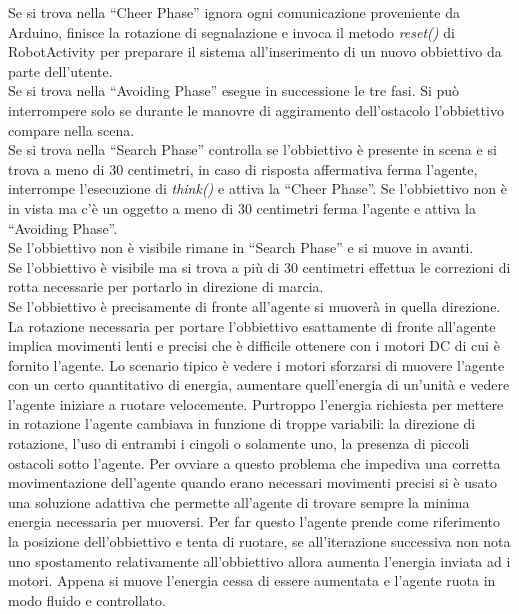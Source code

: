Se si trova nella ``Cheer Phase'' ignora ogni comunicazione proveniente da 
Arduino, finisce la rotazione di segnalazione e invoca il metodo \emph{reset()} di 
RobotActivity per preparare il sistema all'inserimento di un nuovo obbiettivo da 
parte dell'utente.\\
Se si trova nella ``Avoiding Phase'' esegue in successione le tre fasi. 
Si può interrompere solo se durante le manovre di aggiramento dell'ostacolo
l'obbiettivo compare nella scena.\\
Se si trova nella ``Search Phase'' controlla se l'obbiettivo è presente in scena e 
si trova a meno di 30 centimetri, in caso di risposta affermativa ferma l'agente,
interrompe l'esecuzione di \emph{think()} e attiva la ``Cheer Phase''. 
Se l'obbiettivo non è in vista ma c'è un oggetto a meno di 30 centimetri ferma l'agente
e attiva la ``Avoiding Phase''.\\
Se l'obbiettivo non è visibile rimane in ``Search Phase'' e si muove in avanti.\\
Se l'obbiettivo è visibile ma si trova a più di 30 centimetri effettua le correzioni di rotta
necessarie per portarlo in direzione di marcia.\\
Se l'obbiettivo è precisamente di fronte all'agente si muoverà in quella direzione.\\ 
La rotazione necessaria per portare l'obbiettivo esattamente di fronte all'agente 
implica movimenti lenti e precisi che è difficile ottenere con i motori DC di cui è
fornito l'agente. Lo scenario tipico è vedere i motori sforzarsi di muovere l'agente
con un certo quantitativo di energia, aumentare quell'energia di un'unità e vedere 
l'agente iniziare a ruotare velocemente. Purtroppo l'energia richiesta per 
mettere in rotazione l'agente cambiava in funzione di troppe variabili: 
la direzione di rotazione, l'uso di entrambi i cingoli o solamente uno, 
la presenza di piccoli ostacoli sotto l'agente. Per ovviare a questo problema che impediva 
una corretta movimentazione dell'agente quando erano necessari movimenti precisi 
si è usato una soluzione adattiva che permette all'agente di trovare sempre la 
minima energia necessaria per muoversi. Per far questo l'agente prende come riferimento 
la posizione dell'obbiettivo e tenta di ruotare, se all'iterazione successiva 
non nota uno spostamento relativamente all'obbiettivo allora aumenta 
l'energia inviata ad i motori. Appena si muove l'energia cessa di essere 
aumentata e l'agente ruota in modo fluido e controllato.

